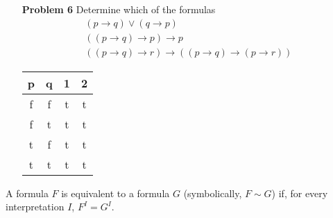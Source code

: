 \documentclass[12pt]{article}
\begin{document}
\begin{enumerate}
\item[\textbf{Problem 6}] Determine which of the formulas 
\begin{gather*}
(p \rightarrow q) \vee  (q \rightarrow p) \\
((p \rightarrow q) \rightarrow  p) \rightarrow p \\
((p \rightarrow q) \rightarrow r) \rightarrow  ((p \rightarrow q) \rightarrow (p \rightarrow r ))  
\end{gather*}
    
\begin{table}[H]
\begin{center}
    \begin{tabular}{c c c c}
    \hline
    p & q & 1 & 2 \\ \hline
    f & f & t   & t   \\
    f & t & t   & t   \\
    t & f & t   & t   \\
    t & t & t   & t   \\ \hline
    \end{tabular}
\end{center}
\end{table}
\end{enumerate}

\noindent A formula $F$ is equivalent to a formula $G$ (symbolically, $F \sim G$) if, for every interpretation $I$, $F^I = G^I$. 
\end{document}
